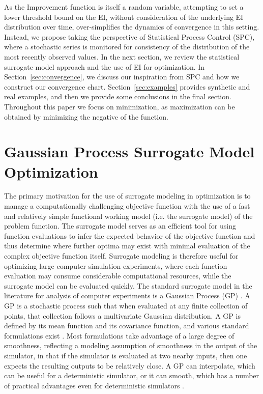 \documentclass[12pt]{article}
\begin{document}
%
%

%
As the Improvement function is itself a random variable, attempting to 
set a lower threshold bound on the EI, without consideration of the underlying 
EI distribution over time, over-simplifies the dynamics of convergence
in this setting. 
%
Instead, we propose taking the perspective of Statistical
Process Control (SPC), where a stochastic series is monitored for 
consistency of the distribution of the most recently observed values.
In the next section, we review the statistical surrogate model approach and the use of EI for optimization.  In Section~\ref{sec:convergence}, we discuss our inspiration from SPC and how we construct our convergence chart.  Section~\ref{sec:examples} provides synthetic and real examples, and then we provide some conclusions in the final section. Throughout this paper we focus on minimization, as maximization can be obtained by minimizing the negative of the function.

%
%
\section{Gaussian Process Surrogate Model Optimization}
\label{sec:gp}
%
%

%
The primary motivation for the use of surrogate modeling in optimization is to manage a computationally challenging objective function with the use of a fast and relatively simple functional working model (i.e. the surrogate model) of the problem function. 
%
The surrogate model serves as an efficient tool for using function evaluations to infer the expected behavior of the objective function and thus determine where further optima may exist with minimal evaluation of the complex objective function itself.
%
Surrogate modeling is therefore useful for optimizing large computer simulation experiments, where each function evaluation may consume considerable computational resources, while the surrogate model can be evaluated quickly.
%
The standard surrogate model in the literature for analysis of computer experiments is a Gaussian Process (GP) \citep{sacksDesign, santnerBook}. A GP is a stochastic process such that when evaluated at any finite collection of points, that collection follows a multivariate Gaussian distribution. A GP is defined by its mean function and its covariance function, and various standard formulations exist \citep{abrahamsenBook,steinBook}. Most formulations take advantage of a large degree of smoothness, reflecting a modeling assumption of smoothness in the output of the simulator, in that if the simulator is evaluated at two nearby inputs, then one expects the resulting outputs to be relatively close. A GP can interpolate, which can be useful for a deterministic simulator, or it can smooth, which has a number of practical advantages even for deterministic simulators \citep{gramacy2012}.
\end{document}
